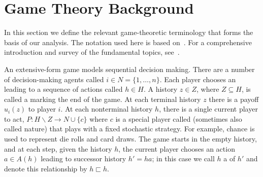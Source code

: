 \documentclass{aamas2014}
\begin{document}
\section{Game Theory Background}


In this section we define the relevant game-theoretic terminology that forms the basis
of our analysis. The notation used here is based on~\cite{OsbRub94}. For a comprehensive introduction and
survey of the fundamental topics, see~\cite{ShoLB08,Weiss13}.


An extensive-form game models sequential decision making. There are a number of decision-making agents called  
$i \in N = \{ 1, \ldots, n \}$. Each player chooses an  leading to a sequence of actions called  $h \in H$. 
A history $z \in Z$, where $Z \subseteq H$, is called a  marking the end of the 
game. At each terminal history $z$ there is a payoff $u_i(z)$ to player $i$. At each nonterminal history $h$, there is a single 
current player to act, $P: H \backslash Z \rightarrow N \cup \{ c \}$ where $c$ is a special player called 
(sometimes also called nature) that plays with a fixed stochastic strategy. For example, chance is used to represent die rolls 
and card draws. The game starts in the empty history, and 
at each step, given the history $h$, the current player chooses an action $a \in A(h)$ leading to successor history $h' = ha$;
in this case we call $h$ a  of $h'$ and denote this relationship by $h \sqsubset h$.
\end{document}
